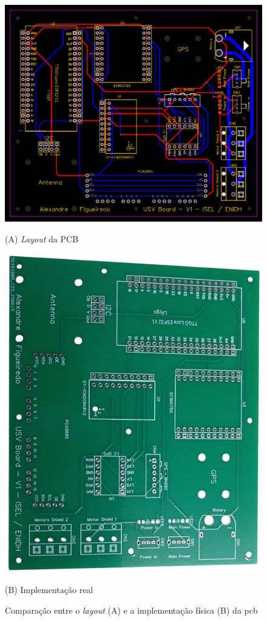\begin{figure}[H]
    \centering
    \begin{minipage}{0.45\linewidth}
        \centering
        \includegraphics[width=0.80\linewidth]{figuras/PCB_PCB_USV-Board_2025-09-21.png}
        \caption*{(A) \emph{Layout} da PCB}
    \end{minipage}
    \hfill
    \begin{minipage}{0.40\linewidth}
        \centering
        \includegraphics[width=0.80\linewidth,angle=90]{figuras/pcb-real.png}
        \caption*{(B) Implementação real}
    \end{minipage}
    \caption[Comparação entre o \emph{layout} e a implementação física da \gls{pcb}]{Comparação entre o \emph{layout} (A) e a implementação física (B) da \gls{pcb}}
    \label{fig:pcb-esquematica-vs-real}
\end{figure}

